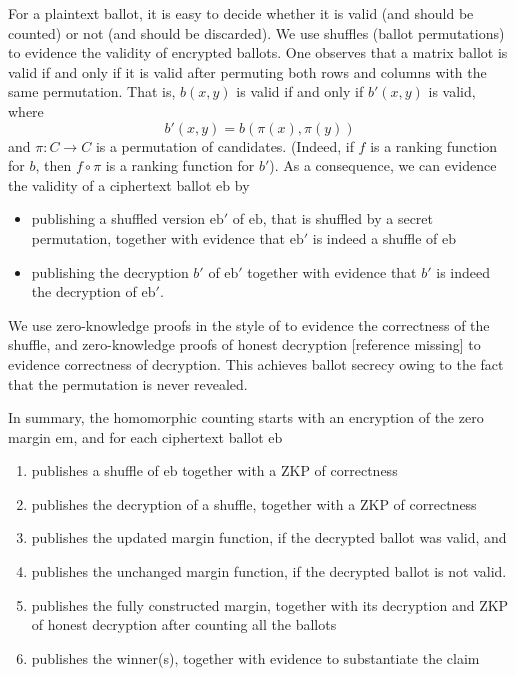 \documentclass{llncs}
\newcommand{\encb}{\mathrm{eb}}
\newcommand{\encm}{\mathrm{em}}
\begin{document}
For a plaintext ballot, it is easy to decide whether it is
valid (and should be counted) or not (and should be discarded). We
use shuffles (ballot permutations) to evidence the validity of
encrypted ballots. One observes that a matrix ballot is valid if and
only if it is valid after permuting both rows and columns with the
same permutation. That is, $b(x,y)$ is valid if and only if $b'(x,y)$
is valid, where
\[ b'(x,y) = b(\pi(x), \pi(y)) \]
and $\pi: C \to C$ is a permutation of candidates. (Indeed, if $f$
is a ranking function for $b$, then $f \circ \pi$ is a ranking
function for $b'$). As a consequence, we can evidence the validity
of a ciphertext ballot $\encb$ by
\begin{itemize}
  \item publishing a shuffled version $\encb'$ of $\encb$, that is
  shuffled by a secret permutation, together with
  evidence that $\encb'$ is indeed a shuffle of $\encb$
  \item publishing the decryption $b'$ of $\encb'$ together with
  evidence that $b'$ is indeed the decryption of $\encb'$.
\end{itemize}

We use zero-knowledge proofs in the style of \cite{DBLP:conf/africacrypt/TereliusW10}
to evidence the correctness of the shuffle, and zero-knowledge
proofs of honest decryption [reference missing] to evidence
correctness of decryption. This achieves ballot secrecy owing to the
fact that the permutation is never revealed.

In summary, the homomorphic counting starts
with an encryption of the zero margin $\encm$, and for each
ciphertext ballot $\encb$
\begin{enumerate}
\item publishes a shuffle of $\encb$ together with a ZKP of 
correctness
\item publishes the decryption of a shuffle, together with a ZKP of
correctness
\item publishes the updated margin function, if the decrypted ballot
was valid, and
\item publishes the unchanged margin function, if the decrypted
ballot is not valid.
\item publishes the fully constructed margin, together with its decryption  
  and ZKP of honest decryption after counting all the ballots     
\item publishes the winner(s), together with evidence to substantiate the
    claim
\end{enumerate}
\end{document}
